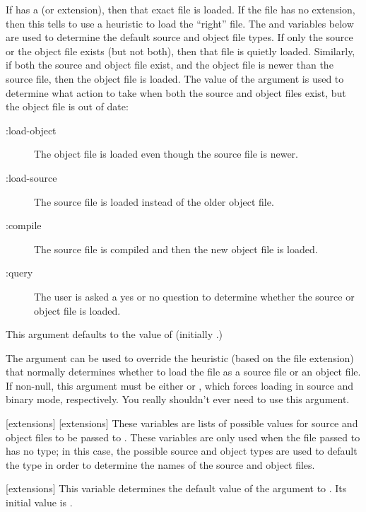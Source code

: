 If  has a  (or extension), then that exact
file is loaded.  If the file has no extension, then this tells  to
use a heuristic to load the ``right'' file.  The
 and  variables below are
used to determine the default source and object file types.  If only the source
or the object file exists (but not both), then that file is quietly loaded.
Similarly, if both the source and object file exist, and the object file is
newer than the source file, then the object file is loaded.
The value of the  argument is used to determine what
action to take when both the source and object files exist, but the object file
is out of date:
\begin{description}
\item[:load-object]
The object file is loaded even though the source file is
newer.

\item[:load-source]
The source file is loaded instead of the older object file.

\item[:compile]
The source file is compiled and then the new object file is
loaded.

\item[:query]
The user is asked a yes or no question to determine whether the
source or object file is loaded.
\end{description}
This argument defaults to the value of 
(initially .)

The  argument can be used to override the heuristic (based on the
file extension) that normally determines whether to load the file as a source
file or an object file.  If non-null, this argument must be either
 or , which forces loading in source and binary
mode, respectively. You really shouldn't ever need to use this argument.
\enddefun

[extensions]
[extensions]
These variables are lists of possible  values for source
and object files to be passed to .  These variables are only used
when the file passed to  has no type; in this case, the possible
source and object types are used to default the type in order to determine the
names of the source and object files.
\enddefvar

[extensions]
This variable determines the default value of the 
argument to .  Its initial value is .
\enddefvar

